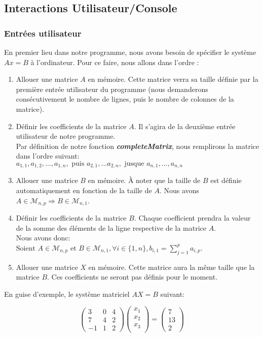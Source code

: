 \subsection{Interactions Utilisateur/Console}
\subsubsection{Entrées utilisateur}

En premier lieu dans notre programme, nous avons besoin de spécifier le système $Ax=B$ à l'ordinateur. 
Pour ce faire, nous allons dans l'ordre :
\begin{enumerate}
\item Allouer une matrice $A$ en mémoire. Cette matrice verra sa taille définie par la première entrée utilisateur du programme (nous demanderons consécutivement le nombre de lignes, puis le nombre de colonnes de la matrice).
\item Définir les coefficients de la matrice $A$. Il s'agira de la deuxième entrée utilisateur de notre programme. \\
Par définition de notre fonction \textit{\textbf{completeMatrix}}, nous remplirons la matrice dans l'ordre suivant:\\
$a_{1,1}, a_{1,2}, ..., a_{1,n}, \text{   puis   } a_{2,1}, ... a_{2,n}, \text{   jusque   }  a_{n,1}, ..., a_{n,n}$
\item Allouer une matrice $B$ en mémoire. À noter que la taille de $B$ est définie automatiquement en fonction de la taille de $A$. Nous avons $A\in \mathcal{M}_{n,p} \Rightarrow B\in \mathcal{M}_{n,1}$.
\item Définir les coefficients de la matrice $B$. Chaque coefficient prendra la valeur de la somme des éléments de la ligne respective de la matrice $A$.\\
Nous avons donc:\\ $ \text{Soient } A\in \mathcal{M}_{n,p} \text{ et } B\in \mathcal{M}_{n,1}  , \forall i \in \{1,n\}  , b_{i,1}=\sum_{j=1}^{p} a_{i,p}$.\\
\item Allouer une matrice $X$ en mémoire. Cette matrice aura la même taille que la matrice $B$. Ces coefficients ne seront pas définis pour le moment.
\end{enumerate}
En guise d'exemple, le système matriciel $AX=B$ suivant:

\begin{equation}
\begin{pmatrix}
3 & 0 & 4\\
7 & 4 & 2 \\
-1 & 1 & 2
\end{pmatrix} 
\begin{pmatrix}
x_1\\
x_2\\
x_3\\
\end{pmatrix}
=
\begin{pmatrix}
7 \\
13 \\
2
\end{pmatrix}
\end{equation}
\\


